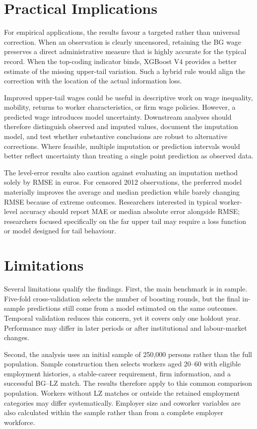 \documentclass[12pt,a4paper,oneside,titlepage]{book}
\begin{document}
\section{Practical Implications}
For empirical applications, the results favour a targeted rather than universal correction. When an observation is clearly uncensored, retaining the BG wage preserves a direct administrative measure that is highly accurate for the typical record. When the top-coding indicator binds, XGBoost V4 provides a better estimate of the missing upper-tail variation. Such a hybrid rule would align the correction with the location of the actual information loss.

Improved upper-tail wages could be useful in descriptive work on wage inequality, mobility, returns to worker characteristics, or firm wage policies. However, a predicted wage introduces model uncertainty. Downstream analyses should therefore distinguish observed and imputed values, document the imputation model, and test whether substantive conclusions are robust to alternative corrections. Where feasible, multiple imputation or prediction intervals would better reflect uncertainty than treating a single point prediction as observed data.

The level-error results also caution against evaluating an imputation method solely by RMSE in euros. For censored 2012 observations, the preferred model materially improves the average and median prediction while barely changing RMSE because of extreme outcomes. Researchers interested in typical worker-level accuracy should report MAE or median absolute error alongside RMSE; researchers focused specifically on the far upper tail may require a loss function or model designed for tail behaviour.

\section{Limitations}
Several limitations qualify the findings. First, the main benchmark is in sample. Five-fold cross-validation selects the number of boosting rounds, but the final in-sample predictions still come from a model estimated on the same outcomes. Temporal validation reduces this concern, yet it covers only one holdout year. Performance may differ in later periods or after institutional and labour-market changes.

Second, the analysis uses an initial sample of 250,000 persons rather than the full population. Sample construction then selects workers aged 20--60 with eligible employment histories, a stable-career requirement, firm information, and a successful BG--LZ match. The results therefore apply to this common comparison population. Workers without LZ matches or outside the retained employment categories may differ systematically. Employer size and coworker variables are also calculated within the sample rather than from a complete employer workforce.
\end{document}
